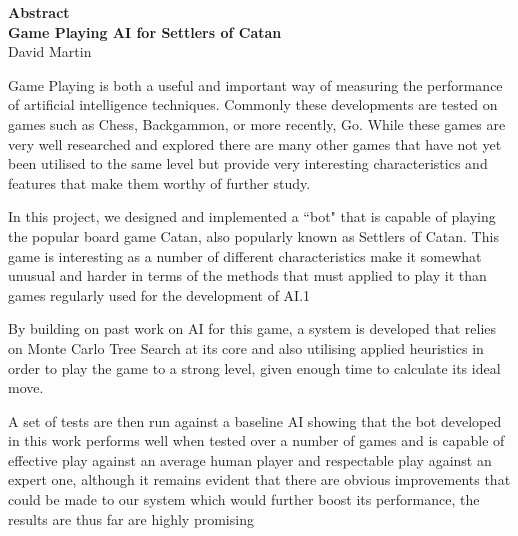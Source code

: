 \documentclass[]{article}
\newcommand\blankpage{%
    \null
    \thispagestyle{empty}%
    \addtocounter{page}{-1}%
    \newpage}
\newenvironment{changemargin}[2]{%
\begin{list}{}{%
\setlength{\topsep}{0pt}%
\setlength{\leftmargin}{#1}%
\setlength{\rightmargin}{#2}%
\setlength{\listparindent}{\parindent}%
\setlength{\itemindent}{\parindent}%
\setlength{\parsep}{\parskip}%
}%
\item[]}{\end{list}}
\begin{document}
\blankpage

\thispagestyle{plain}
\begin{center}
    \huge
    \textbf{Abstract}
    \\
    \large
    \vspace{1.0cm}
    \textbf{Game Playing AI for Settlers of Catan}   
    \vspace{0.2cm}
    \\
    David Martin
    \vspace{0.1cm}
    \\ 
    \noindent\makebox[\linewidth]{\rule{\textwidth}{1pt}} 
\end{center}


\begin{changemargin}{1.8cm}{1.8cm}
 Game Playing is both a useful and important way of measuring the performance of artificial intelligence techniques. Commonly these developments are tested on games such as Chess, Backgammon, or more recently, Go. While these games are very well researched and explored there are many other games that have not yet been utilised to the same level but provide very interesting characteristics and 
 features that make them worthy of further study.
 
 In this project, we designed and implemented a ``bot" that is capable of playing the popular board game Catan, also popularly known as Settlers of Catan. This game is interesting as a number of different characteristics make it somewhat unusual and harder in terms of the methods that must applied to play it than games regularly used for the development of AI.1
 
 By building on past work on AI for this game, a system is developed that relies on Monte Carlo Tree Search at its core and also utilising applied heuristics in order to play the game to a strong level, given enough time to calculate its ideal move.
 
 A set of tests are then run against a baseline AI showing that the bot developed in this work performs well when tested over a number of games and is capable of effective play against an average human player and respectable play against an expert one, although it remains evident that there are obvious improvements that could be made to our system which would further boost its performance, the results are thus far are highly promising
\end{changemargin}


\pagebreak
\end{document}
